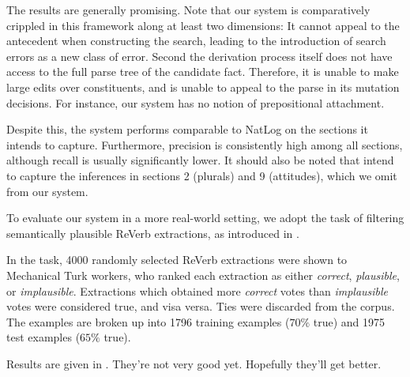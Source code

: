 The results are generally promising.
Note that our system is comparatively crippled in this framework
  along at least two dimensions:
It cannot appeal to the antecedent when constructing the search,
  leading to the introduction of search errors as a new class of
  error.
Second the derivation process itself does not have access to the
  full parse tree of the candidate fact.
Therefore, it is unable to make large edits over constituents,
  and is unable to appeal to the parse in its mutation decisions.
For instance, our system has no notion of prepositional attachment.

Despite this, the system performs comparable to NatLog on the sections
  it intends to capture.
Furthermore, precision is consistently high among all sections, although
  recall is usually significantly lower.
It should also be noted that  
  intend to capture the inferences in sections 2 (plurals)
  and 9 (attitudes), which we omit from our system.

%
%

To evaluate our system in a more real-world setting, we adopt the
  task of filtering semantically plausible ReVerb extractions,
  as introduced in .

In the task, 4000 randomly selected ReVerb extractions were shown to
  Mechanical Turk workers, who ranked each extraction as either
  \textit{correct}, \textit{plausible}, or \textit{implausible}.
Extractions which obtained more \textit{correct} votes than
  \textit{implausible} votes were considered true, and visa versa.
Ties were discarded from the corpus.
The examples are broken up into 1796 training examples ($70\%$ true)
  and 1975 test examples ($65\%$ true).

Results are given in .
They're not very good yet.
Hopefully they'll get better.
